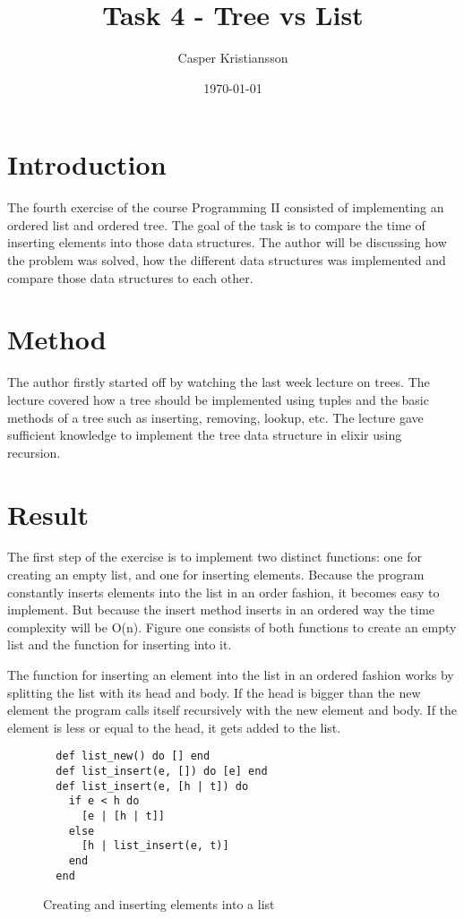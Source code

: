 \documentclass[a4paper,11pt]{article}
\begin{document}
\title{
    \textbf{Task 4 - Tree vs List}
}
\author{Casper Kristiansson}
\date{\today}

\maketitle

\section*{Introduction}
The fourth exercise of the course Programming II consisted of implementing an ordered list and ordered tree. The goal of the task is to compare the time of inserting elements into those data structures. The author will be discussing how the problem was solved, how the different data structures was implemented and compare those data structures to each other.

\section*{Method}
The author firstly started off by watching the last week lecture on trees. The lecture covered how a tree should be implemented using tuples and the basic methods of a tree such as inserting, removing, lookup, etc. The lecture gave sufficient knowledge to implement the tree data structure in elixir using recursion.

\section*{Result}
The first step of the exercise is to implement two distinct functions: one for creating an empty list, and one for inserting elements. Because the program constantly inserts elements into the list in an order fashion, it becomes easy to implement. But because the insert method inserts in an ordered way the time complexity will be O(n). Figure one consists of both functions to create an empty list and the function for inserting into it.

The function for inserting an element into the list in an ordered fashion works by splitting the list with its head and body. If the head is bigger than the new element the program calls itself recursively with the new element and body. If the element is less or equal to the head, it gets added to the list.


\begin{figure}[H]
\begin{verbatim}
  def list_new() do [] end
  def list_insert(e, []) do [e] end
  def list_insert(e, [h | t]) do
    if e < h do
      [e | [h | t]]
    else
      [h | list_insert(e, t)]
    end
  end
\end{verbatim}
\caption{Creating and inserting elements into a list}
\label{Figure:1}
\end{figure}
\end{document}
